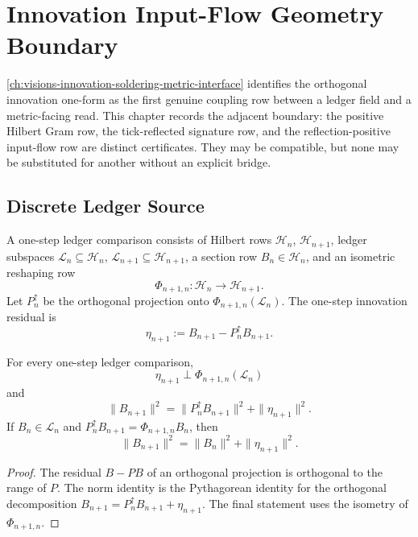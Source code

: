 \chapter{Innovation Input-Flow Geometry Boundary}
\label{ch:visions-innovation-input-geometry-boundary}

\autoref{ch:visions-innovation-soldering-metric-interface} identifies the
orthogonal innovation one-form as the first genuine coupling row between a
ledger field and a metric-facing read. This chapter records the adjacent
boundary: the positive Hilbert Gram row, the tick-reflected signature row,
and the reflection-positive input-flow row are distinct certificates. They
may be compatible, but none may be substituted for another without an
explicit bridge.

\section{Discrete Ledger Source}
\label{sec:innovation-input-discrete-ledger-source}

\begin{definition}
\label{def:innovation-input-one-step-ledger-comparison}
A one-step ledger comparison consists of Hilbert rows
$\mathcal H_n$, $\mathcal H_{n+1}$, ledger subspaces
$\mathcal L_n\subseteq\mathcal H_n$, $\mathcal L_{n+1}\subseteq
\mathcal H_{n+1}$, a section row $B_n\in\mathcal H_n$, and an isometric
reshaping row
$$
\Phi_{n+1,n}:\mathcal H_n\to\mathcal H_{n+1}.
$$
Let $P_n^\uparrow$ be the orthogonal projection onto
$\Phi_{n+1,n}(\mathcal L_n)$. The one-step innovation residual is
$$
\eta_{n+1}:=B_{n+1}-P_n^\uparrow B_{n+1}.
$$
\end{definition}

\begin{theorem}
\label{thm:innovation-input-orthogonal-admission-law}
For every one-step ledger comparison,
$$
\eta_{n+1}\perp\Phi_{n+1,n}(\mathcal L_n)
$$
and
$$
\|B_{n+1}\|^2
=
\|P_n^\uparrow B_{n+1}\|^2+\|\eta_{n+1}\|^2.
$$
If $B_n\in\mathcal L_n$ and
$P_n^\uparrow B_{n+1}=\Phi_{n+1,n}B_n$, then
$$
\|B_{n+1}\|^2
=
\|B_n\|^2+\|\eta_{n+1}\|^2.
$$
\end{theorem}

\begin{proof}
The residual $B-PB$ of an orthogonal projection is orthogonal to the
range of $P$. The norm identity is the Pythagorean identity for the
orthogonal decomposition $B_{n+1}=P_n^\uparrow B_{n+1}+\eta_{n+1}$.
The final statement uses the isometry of $\Phi_{n+1,n}$.
\end{proof}

